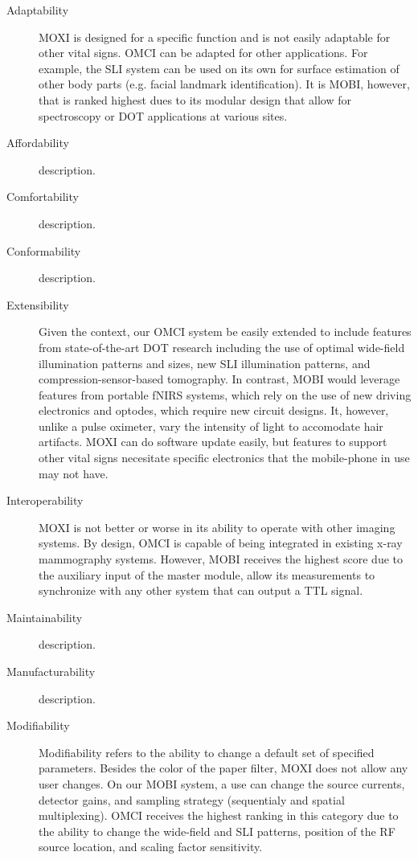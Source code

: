 \begin{description}
   \item[Adaptability] \ac{MOXI} is designed for a specific function and is not easily adaptable for other vital signs. \ac{OMCI} can be adapted for other applications. For example, the \ac{SLI} system can be used on its own for surface estimation of other body parts (e.g. facial landmark identification). It is \ac{MOBI}, however, that is ranked highest dues to its modular design that allow for spectroscopy or \ac{DOT} applications at various sites. 
   
   \item[Affordability] description.
   \item[Comfortability] description.
   \item[Conformability] description.
   \item[Extensibility] Given the context, our \ac{OMCI} system be easily extended to include features from state-of-the-art \ac{DOT} research including the use of optimal wide-field illumination patterns and sizes, new \ac{SLI} illumination patterns, and compression-sensor-based tomography.  In contrast, \ac{MOBI} would leverage features from portable fNIRS systems, which rely on the use of new driving electronics and optodes, which require new circuit designs. It, however, unlike a pulse oximeter, vary the intensity of light to accomodate hair artifacts. \ac{MOXI} can do software update easily, but features to support other vital signs necesitate specific electronics that the mobile-phone in use may not have. 
   \item[Interoperability] \ac{MOXI} is not better or worse in its ability to operate with other imaging systems. By design, \ac{OMCI} is capable of being integrated in existing x-ray mammography systems. However, \ac{MOBI} receives the highest score due to the auxiliary input of the master module, allow its measurements to synchronize with any other system that can output a \ac{TTL} signal. 
   \item[Maintainability] description.
   \item[Manufacturability] description.
   \item[Modifiability] Modifiability refers to the ability to change a default set of specified parameters. Besides the color of the paper filter, \ac{MOXI} does not allow any user changes. On our \ac{MOBI} system, a use can change the source currents, detector gains, and sampling strategy (sequentialy and spatial multiplexing). \ac{OMCI} receives the highest ranking in this category due to the ability to change the wide-field and \ac{SLI} patterns, position of the \ac{RF} source location, and scaling factor sensitivity. 

\end{description}
